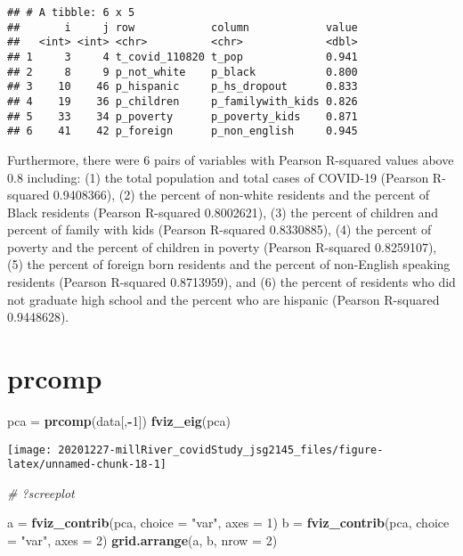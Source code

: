 \documentclass[
]{article}
\newenvironment{Shaded}{\begin{snugshade}}{\end{snugshade}}
\newcommand{\CommentTok}[1]{\textcolor[rgb]{0.56,0.35,0.01}{\textit{#1}}}
\newcommand{\DataTypeTok}[1]{\textcolor[rgb]{0.13,0.29,0.53}{#1}}
\newcommand{\DecValTok}[1]{\textcolor[rgb]{0.00,0.00,0.81}{#1}}
\newcommand{\KeywordTok}[1]{\textcolor[rgb]{0.13,0.29,0.53}{\textbf{#1}}}
\newcommand{\NormalTok}[1]{#1}
\newcommand{\OperatorTok}[1]{\textcolor[rgb]{0.81,0.36,0.00}{\textbf{#1}}}
\newcommand{\StringTok}[1]{\textcolor[rgb]{0.31,0.60,0.02}{#1}}
\begin{document}
\begin{verbatim}
## # A tibble: 6 x 5
##       i     j row            column            value
##   <int> <int> <chr>          <chr>             <dbl>
## 1     3     4 t_covid_110820 t_pop             0.941
## 2     8     9 p_not_white    p_black           0.800
## 3    10    46 p_hispanic     p_hs_dropout      0.833
## 4    19    36 p_children     p_familywith_kids 0.826
## 5    33    34 p_poverty      p_poverty_kids    0.871
## 6    41    42 p_foreign      p_non_english     0.945
\end{verbatim}

Furthermore, there were 6 pairs of variables with Pearson R-squared
values above 0.8 including: (1) the total population and total cases of
COVID-19 (Pearson R-squared 0.9408366), (2) the percent of non-white
residents and the percent of Black residents (Pearson R-squared
0.8002621), (3) the percent of children and percent of family with kids
(Pearson R-squared 0.8330885), (4) the percent of poverty and the
percent of children in poverty (Pearson R-squared 0.8259107), (5) the
percent of foreign born residents and the percent of non-English
speaking residents (Pearson R-squared 0.8713959), and (6) the percent of
residents who did not graduate high school and the percent who are
hispanic (Pearson R-squared 0.9448628).

\hypertarget{prcomp}{%
\section{prcomp}\label{prcomp}}

\begin{Shaded}
\begin{Highlighting}[]
\NormalTok{pca =}\StringTok{ }\KeywordTok{prcomp}\NormalTok{(data[,}\OperatorTok{-}\DecValTok{1}\NormalTok{])}
\KeywordTok{fviz_eig}\NormalTok{(pca)}
\end{Highlighting}
\end{Shaded}

\texttt{[image: 20201227-millRiver\_covidStudy\_jsg2145\_files/figure-latex/unnamed-chunk-18-1]}

\begin{Shaded}
\begin{Highlighting}[]
  \CommentTok{# ?screeplot}
\end{Highlighting}
\end{Shaded}

\begin{Shaded}
\begin{Highlighting}[]
\NormalTok{a =}\StringTok{ }\KeywordTok{fviz_contrib}\NormalTok{(pca, }\DataTypeTok{choice =} \StringTok{"var"}\NormalTok{, }\DataTypeTok{axes =} \DecValTok{1}\NormalTok{) }
\NormalTok{b =}\StringTok{ }\KeywordTok{fviz_contrib}\NormalTok{(pca, }\DataTypeTok{choice =} \StringTok{"var"}\NormalTok{, }\DataTypeTok{axes =} \DecValTok{2}\NormalTok{) }
\KeywordTok{grid.arrange}\NormalTok{(a, b, }\DataTypeTok{nrow =} \DecValTok{2}\NormalTok{)}
\end{Highlighting}
\end{Shaded}
\end{document}
